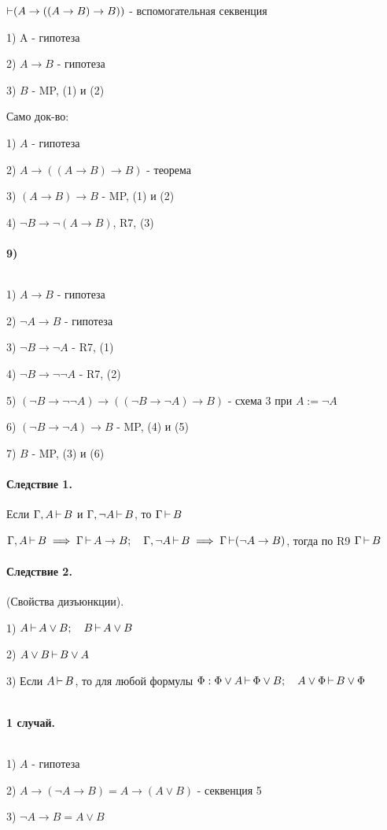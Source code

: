 \begin{myproof}
$\operatorname{\vdash} (A \to ((A \to B) \to B))$ - вспомогательная секвенция

1) A - гипотеза

2) $A \to B$ - гипотеза

3) $B$ - MP, (1) и (2)

Само док-во:

1) $A$ - гипотеза

2)  $A \to ((A \to B) \to B)$ - теорема

3) $(A \to B) \to B$ - MP, (1) и (2)

4) $\lnot B \to \lnot(A \to B)$, R7, (3)

\paragraph*{9)} ${}$ \newline

1) $A \to B$ - гипотеза

2) $\lnot A \to B$ - гипотеза

3) $\lnot B \to \lnot A$ - R7, (1)

4) $\lnot B \to \lnot\lnot A$ - R7, (2)

5) $(\lnot B \to \lnot\lnot A) \to ((\lnot B \to \lnot A) \to B)$ - схема 3 при $A :=\lnot A$

6)  $(\lnot B \to \lnot A) \to B$ - MP, (4) и (5) 

7) $B$ - MP, (3) и (6)

\end{myproof}

\paragraph*{Следствие 1.}
Если $\Gamma,A \operatorname{\vdash} B$ и  $\Gamma,\lnot A \operatorname{\vdash} B$, то  $\Gamma \operatorname{\vdash} B$
\begin{myproof}
$\Gamma,A\operatorname{\vdash} B \implies\Gamma \operatorname{\vdash} A \to B; \quad \Gamma,\lnot A\operatorname{\vdash} B \implies \Gamma \operatorname{\vdash}(\lnot
A \to B)$, тогда по R9 $\Gamma \operatorname{\vdash} B$
\end{myproof}


\paragraph*{Следствие 2.} (Свойства дизъюнкции).

1) $A \operatorname{\vdash} A \lor B; \quad B \operatorname{\vdash} A \lor B$ 

2) $A \lor B \operatorname{\vdash} B \lor A$

3) Если  $A \operatorname{\vdash} B$, то для любой формулы  $\Phi: \Phi \lor A \operatorname{\vdash} \Phi \lor B; \quad 
A \lor \Phi \operatorname{\vdash} B \lor \Phi$
\begin{myproof}
${}$
\paragraph*{1 случай.} ${}$ \newline

1) $A$ - гипотеза

2)  $A \to (\lnot A \to B) = A \to (A \lor B)$ - секвенция 5

3) $\lnot A \to B = A \lor B$
\end{myproof}



